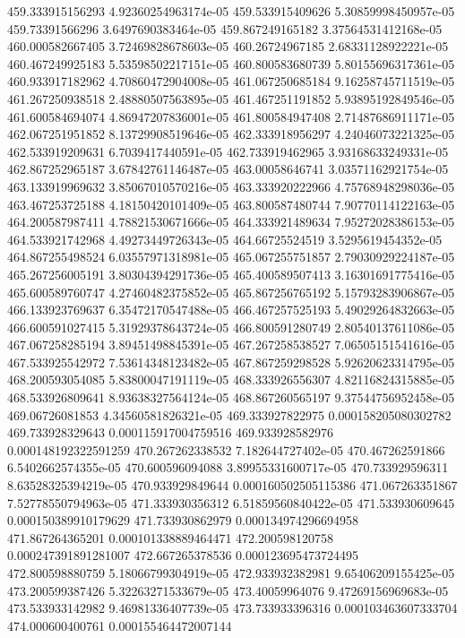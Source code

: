 {459.333915156293 4.92360254963174e-05
459.533915409626 5.30859998450957e-05
459.73391566296 3.6497690383464e-05
459.867249165182 3.37564531412168e-05
460.000582667405 3.72469828678603e-05
460.26724967185 2.68331128922221e-05
460.467249925183 5.53598502217151e-05
460.800583680739 5.80155696317361e-05
460.933917182962 4.70860472904008e-05
461.067250685184 9.16258745711519e-05
461.267250938518 2.48880507563895e-05
461.467251191852 5.93895192849546e-05
461.600584694074 4.86947207836001e-05
461.800584947408 2.71487686911171e-05
462.067251951852 8.13729908519646e-05
462.333918956297 4.24046073221325e-05
462.533919209631 6.7039417440591e-05
462.733919462965 3.93168633249331e-05
462.867252965187 3.67842761146487e-05
463.00058646741 3.03571162921754e-05
463.133919969632 3.85067010570216e-05
463.333920222966 4.75768948298036e-05
463.467253725188 4.18150420101409e-05
463.800587480744 7.90770114122163e-05
464.200587987411 4.78821530671666e-05
464.333921489634 7.95272028386153e-05
464.533921742968 4.49273449726343e-05
464.66725524519 3.5295619454352e-05
464.867255498524 6.03557971318981e-05
465.067255751857 2.79030929224187e-05
465.267256005191 3.80304394291736e-05
465.400589507413 3.16301691775416e-05
465.600589760747 4.27460482375852e-05
465.867256765192 5.15793283906867e-05
466.133923769637 6.35472170547488e-05
466.467257525193 5.49029264832663e-05
466.600591027415 5.31929378643724e-05
466.800591280749 2.80540137611086e-05
467.067258285194 3.89451498845391e-05
467.267258538527 7.06505151541616e-05
467.533925542972 7.53614348123482e-05
467.867259298528 5.92620623314795e-05
468.200593054085 5.83800047191119e-05
468.333926556307 4.82116824315885e-05
468.533926809641 8.93638327564124e-05
468.867260565197 9.37544756952458e-05
469.06726081853 4.34560581826321e-05
469.333927822975 0.000158205080302782
469.733928329643 0.000115917004759516
469.933928582976 0.000148192322591259
470.267262338532 7.182644727402e-05
470.467262591866 6.5402662574355e-05
470.600596094088 3.89955331600717e-05
470.733929596311 8.63528325394219e-05
470.933929849644 0.000160502505115386
471.067263351867 7.52778550794963e-05
471.333930356312 6.51859560840422e-05
471.533930609645 0.000150389910179629
471.733930862979 0.000134974296694958
471.867264365201 0.000101338889464471
472.200598120758 0.000247391891281007
472.667265378536 0.000123695473724495
472.800598880759 5.18066799304919e-05
472.933932382981 9.65406209155425e-05
473.200599387426 5.32263271533679e-05
473.40059964076 9.47269156969683e-05
473.533933142982 9.46981336407739e-05
473.733933396316 0.000103463607333704
474.000600400761 0.000155464472007144
}
